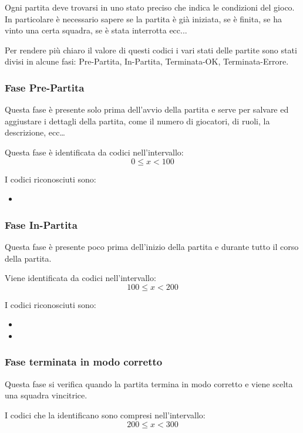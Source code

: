 Ogni partita deve trovarsi in uno stato preciso che indica le condizioni del gioco. In particolare è necessario sapere se la partita è già iniziata, se è finita, se ha vinto una certa squadra, se è stata interrotta ecc...

Per rendere più chiaro il valore di questi codici i vari stati delle partite sono stati divisi in alcune fasi: Pre-Partita, In-Partita, Terminata-OK, Terminata-Errore.

\subsubsection{Fase Pre-Partita}
Questa fase è presente solo prima dell'avvio della partita e serve per salvare ed aggiustare i dettagli della partita, come il numero di giocatori, di ruoli, la descrizione, ecc\dots

Questa fase è identificata da codici nell'intervallo:
\[
0 \le x < 100
\]

I codici riconosciuti sono:
\begin{itemize}[noitemsep,nolistsep]
	\item {}
\end{itemize}


\subsubsection{Fase In-Partita}
Questa fase è presente poco prima dell'inizio della partita e durante tutto il corso della partita. 

Viene identificata da codici nell'intervallo:
\[
100 \le x < 200
\]

I codici riconosciuti sono:
\begin{itemize}[noitemsep,nolistsep]
	\item {}
	\item {}
\end{itemize}


\subsubsection{Fase terminata in modo corretto}
Questa fase si verifica quando la partita termina in modo corretto e viene scelta una squadra vincitrice.

I codici che la identificano sono compresi nell'intervallo:
\[
200 \le x < 300
\]

